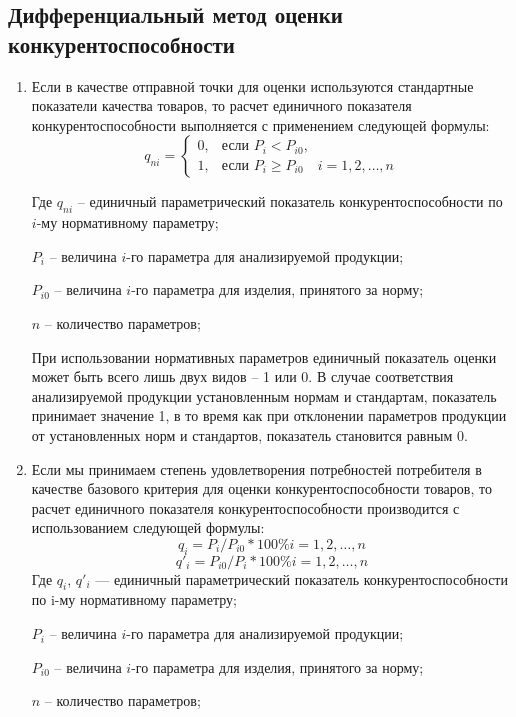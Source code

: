 \documentclass[14pt, a4paper]{extarticle}
\begin{document}
  \subsection{Дифференциальный метод оценки конкурентоспособности}
  \begin{enumerate}
    \item Если в качестве отправной точки для оценки используются стандартные показатели качества товаров, то расчет единичного показателя конкурентоспособности выполняется с применением следующей формулы:
    \[
    q_{ni} = 
    \begin{cases} 
    0, & \text{если } P_i < P_{i0}, \\
    1, & \text{если } P_i \geq P_{i0} \quad i = 1, 2, \ldots, n 
    \end{cases}
    \]
    
    Где \( q_{ni} \) -- единичный параметрический показатель конкурентоспособности по \( i \)-му нормативному параметру;

    \( P_i \) -- величина \( i \)-го параметра для анализируемой продукции;

    \( P_{i0} \) -- величина \( i \)-го параметра для изделия, принятого за норму;

    \( n \) -- количество параметров;
    
    При использовании нормативных параметров единичный показатель оценки может быть всего лишь двух видов -- 1 или 0. В случае соответствия анализируемой продукции установленным нормам и стандартам, показатель принимает значение 1, в то время как при отклонении параметров продукции от установленных норм и стандартов, показатель становится равным 0.


    \item Если мы принимаем степень удовлетворения потребностей потребителя в
    качестве базового критерия для оценки конкурентоспособности товаров,
    то расчет единичного показателя конкурентоспособности производится с
    использованием следующей формулы:
    \[
    q_{i} = P_{i}/P_{i0}*100\% i = 1,2, \ldots , n
    \]
    \[
      q'_{i} = P_{i0}/P_{i}*100\% i = 1,2, \ldots , n
    \]
    Где \(q_{i}\), \(q'_{i}\) — единичный параметрический показатель конкурентоспособности по i-му нормативному параметру;
    
    \( P_i \) -- величина \( i \)-го параметра для анализируемой продукции;

    \( P_{i0} \) -- величина \( i \)-го параметра для изделия, принятого за норму;

    \( n \) -- количество параметров;

\end{enumerate}
\end{document}
